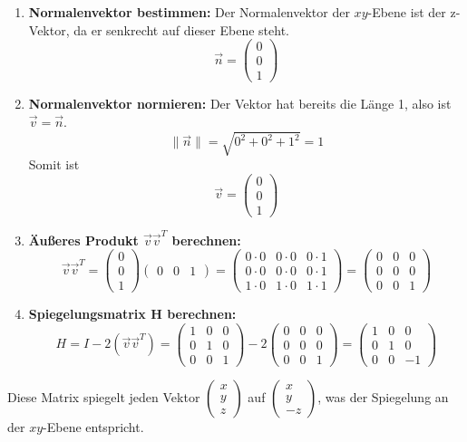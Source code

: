 \begin{enumerate}
    \item \textbf{Normalenvektor bestimmen:} Der Normalenvektor der $xy$-Ebene ist der z-Vektor, da er senkrecht auf dieser Ebene steht.
    \[ \vec{n} = \begin{pmatrix} 0 \\ 0 \\ 1 \end{pmatrix} \]

    \item \textbf{Normalenvektor normieren:} Der Vektor hat bereits die Länge 1, also ist $\vec{v} = \vec{n}$.
    \[ \|\vec{n}\| = \sqrt{0^2 + 0^2 + 1^2} = 1 \]
    Somit ist \[ \vec{v} = \begin{pmatrix} 0 \\ 0 \\ 1 \end{pmatrix} \]

    \item \textbf{Äußeres Produkt $\vec{v}\vec{v}^T$ berechnen:}
    \[ \vec{v}\vec{v}^T = \begin{pmatrix} 0 \\ 0 \\ 1 \end{pmatrix} \begin{pmatrix} 0 & 0 & 1 \end{pmatrix} = \begin{pmatrix}
    0 \cdot 0 & 0 \cdot 0 & 0 \cdot 1 \\
    0 \cdot 0 & 0 \cdot 0 & 0 \cdot 1 \\
    1 \cdot 0 & 1 \cdot 0 & 1 \cdot 1
    \end{pmatrix} = \begin{pmatrix}
    0 & 0 & 0 \\
    0 & 0 & 0 \\
    0 & 0 & 1
    \end{pmatrix} \]

    \item \textbf{Spiegelungsmatrix H berechnen:}
    \[ H = I - 2(\vec{v}\vec{v}^T) = \begin{pmatrix}
    1 & 0 & 0 \\
    0 & 1 & 0 \\
    0 & 0 & 1
    \end{pmatrix} - 2 \begin{pmatrix}
    0 & 0 & 0 \\
    0 & 0 & 0 \\
    0 & 0 & 1
    \end{pmatrix} = \begin{pmatrix}
    1 & 0 & 0 \\
    0 & 1 & 0 \\
    0 & 0 & -1
    \end{pmatrix} \]
\end{enumerate}
Diese Matrix spiegelt jeden Vektor $\begin{pmatrix} x \\ y \\ z \end{pmatrix}$ auf $\begin{pmatrix} x \\ y \\ -z \end{pmatrix}$, was der Spiegelung an der $xy$-Ebene entspricht.